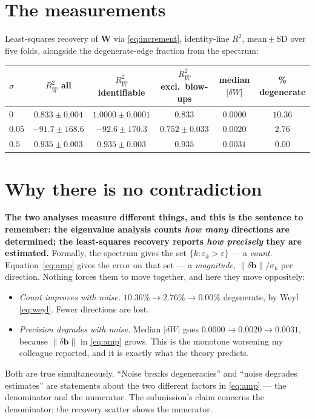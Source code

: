 \documentclass[11pt]{article}
\newcommand{\Mat}[1]{\mathbf{#1}}
\newcommand{\Rw}{R^2_{\widehat W}}
\newcommand{\eps}{\varepsilon}
\begin{document}
\section{The measurements}

Least-squares recovery of $\Mat W$ via \eqref{eq:increment}, identity-line $R^2$,
mean\,$\pm$\,SD over five folds, alongside the degenerate-edge fraction from the
spectrum:

\begin{center}
{\footnotesize
\begin{tabular}{lccccc}
\toprule
$\sigma$ & $\Rw$ all & $\Rw$ identifiable & $\Rw$ excl.\ blow-ups
 & median $|\delta W|$ & \% degenerate \\
\midrule
$0$    & $0.833\pm0.004$ & $1.0000\pm0.0001$ & $0.833$ & $0.0000$ & $10.36$ \\
$0.05$ & $-91.7\pm168.6$ & $-92.6\pm170.3$   & $0.752\pm0.033$ & $0.0020$ & $2.76$ \\
$0.5$  & $0.935\pm0.003$ & $0.935\pm0.003$   & $0.935$ & $0.0031$ & $0.00$ \\
\bottomrule
\end{tabular}}
\end{center}

\section{Why there is no contradiction}

\textbf{The two analyses measure different things, and this is the sentence to
remember: the eigenvalue analysis counts \emph{how many} directions are
determined; the least-squares recovery reports \emph{how precisely} they are
estimated.} Formally, the spectrum gives the set
$\{k : \eps_k > \eps\}$ --- a \emph{count}. Equation~\eqref{eq:amp} gives the
error on that set --- a \emph{magnitude}, $\|\delta\Mat b\|/\sigma_k$ per
direction. Nothing forces them to move together, and here they move oppositely:
\begin{itemize}
\item \emph{Count improves with noise.} $10.36\% \to 2.76\% \to 0.00\%$
      degenerate, by Weyl \eqref{eq:weyl}. Fewer directions are lost.
\item \emph{Precision degrades with noise.} Median $|\delta W|$ goes
      $0.0000 \to 0.0020 \to 0.0031$, because $\|\delta\Mat b\|$ in
      \eqref{eq:amp} grows. This is the monotone worsening my colleague
      reported, and it is exactly what the theory predicts.
\end{itemize}
Both are true simultaneously. ``Noise breaks degeneracies'' and ``noise degrades
estimates'' are statements about the two different factors in \eqref{eq:amp} ---
the denominator and the numerator. The submission's claim concerns the
denominator; the recovery scatter shows the numerator.
\end{document}
